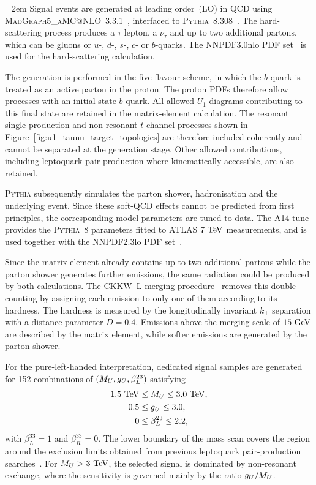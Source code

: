 \begingroup
\emergencystretch=2em
Signal events are generated at leading order~(LO) in QCD using \textsc{MadGraph5\_\allowbreak aMC@NLO}~3.3.1~\cite{Alwall2014MadGraph}, interfaced to \textsc{Pythia}~8.308~\cite{Bierlich2022Pythia83}.
The hard-scattering process produces a $\tau$ lepton, a $\nu_{\tau}$ and up to two additional partons, which can be gluons or $u$-, $d$-, $s$-, $c$- or $b$-quarks.
The NNPDF3.0nlo PDF set~\cite{Ball2015NNPDF30} is used for the hard-scattering calculation.
\par\endgroup

The generation is performed in the five-flavour scheme, in which the $b$-quark is treated as an active parton in the proton.
The proton PDFs therefore allow processes with an initial-state $b$-quark.
All allowed $U_{1}$ diagrams contributing to this final state are retained in the matrix-element calculation.
The resonant single-production and non-resonant $t$-channel processes shown in Figure~\ref{fig:u1_taunu_target_topologies} are therefore included coherently and cannot be separated at the generation stage.
Other allowed contributions, including leptoquark pair production where kinematically accessible, are also retained.

\textsc{Pythia} subsequently simulates the parton shower, hadronisation and the underlying event.
Since these soft-QCD effects cannot be predicted from first principles, the corresponding model parameters are tuned to data. The A14 tune~\cite{Christiansen2025SoftQCD} provides the \textsc{Pythia}~8 parameters fitted to ATLAS $7~\mathrm{TeV}$ measurements, and is used together with the NNPDF2.3lo PDF set~\cite{Carrazza2013NNPDF23LO}.

Since the matrix element already contains up to two additional partons while the parton shower generates further emissions, the same radiation could be produced by both calculations.
The CKKW--L merging procedure~\cite{Lonnblad2012CKKWL} removes this double counting by assigning each emission to only one of them according to its hardness.
The hardness is measured by the longitudinally invariant $k_{\perp}$ separation with a distance parameter $D=0.4$.
Emissions above the merging scale of $15~\mathrm{GeV}$ are described by the matrix element, while softer emissions are generated by the parton shower.

For the pure-left-handed interpretation, dedicated signal samples are generated for 152 combinations of $(M_U,g_U,\beta_L^{23})$ satisfying
\begin{align*}
    1.5~\mathrm{TeV} &\leq M_U \leq 3.0~\mathrm{TeV}, \\
    0.5 &\leq g_U \leq 3.0, \\
    0 &\leq \beta_L^{23} \leq 2.2,
\end{align*}
with $\beta_L^{33}=1$ and $\beta_R^{33}=0$.
The lower boundary of the mass scan covers the region around the exclusion limits obtained from previous leptoquark pair-production searches~\cite{ATLAS2023LQBTau,CMS2021LQThirdGen}.
For $M_U>3~\mathrm{TeV}$, the selected signal is dominated by non-resonant exchange, where the sensitivity is governed mainly by the ratio $g_U/M_U$.

